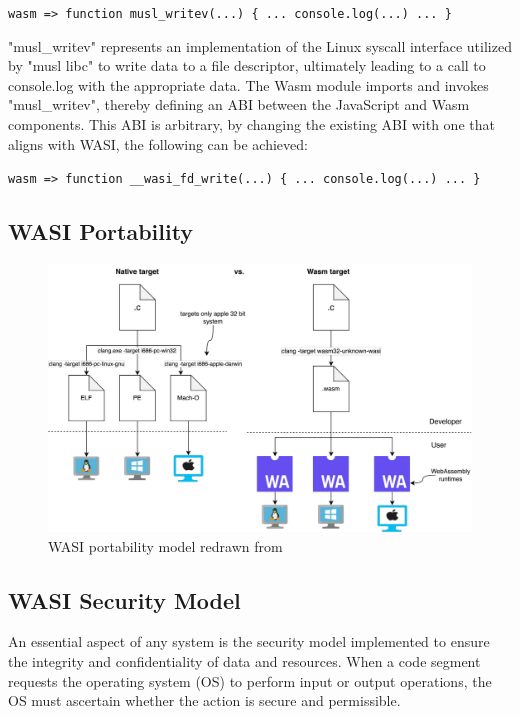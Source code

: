 \verb|wasm => function musl_writev(...) { ... console.log(...) ... }|

"musl\_writev" represents an implementation of the Linux syscall interface utilized by "musl libc" to write data to a file descriptor, ultimately leading to a call to console.log with the appropriate data. The Wasm module imports and invokes "musl\_writev", thereby defining an ABI between the JavaScript and Wasm components. This ABI is arbitrary, by changing the existing ABI with one that aligns with WASI, the following can be achieved:

\verb|wasm => function __wasi_fd_write(...) { ... console.log(...) ... }|



\subsection{WASI Portability}

\begin{figure}[H]
    \centering
        \includegraphics[width=1\linewidth]{images/wasm/WASI_PORTABILITY.pdf}
    \caption{WASI portability model redrawn from \cite{clark_2019_standardising}}
    \label{fig:wasi-portability}
\end{figure}


\subsection{WASI Security Model}
An essential aspect of any system is the security model implemented to ensure the integrity and confidentiality of data and resources. When a code segment requests the operating system (OS) to perform input or output operations, the OS must ascertain whether the action is secure and permissible.


